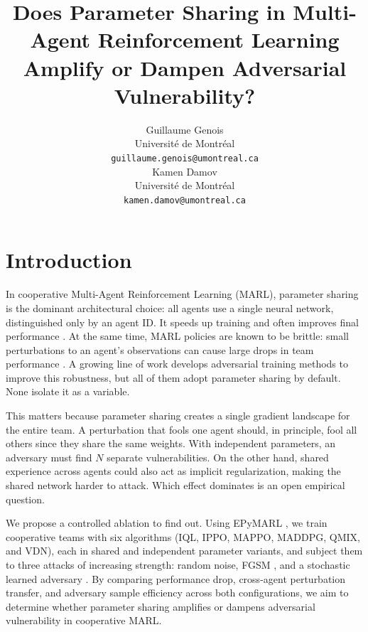 \documentclass{article}
\title{Does Parameter Sharing in Multi-Agent Reinforcement Learning\\Amplify or Dampen Adversarial Vulnerability?}
\author{%
  Guillaume Genois \\
  Université de Montréal \\
  \texttt{guillaume.genois@umontreal.ca} \\
  \And
  Kamen Damov \\
  Université de Montréal \\
  \texttt{kamen.damov@umontreal.ca} \\
}
\begin{document}
\maketitle

\begin{abstract}
\end{abstract}

\section{Introduction}
In cooperative Multi-Agent Reinforcement Learning (MARL), parameter sharing is the dominant architectural choice: all agents use a single neural network, distinguished only by an agent ID. It speeds up training and often improves final performance \citep{gupta2017cooperative}. At the same time, MARL policies are known to be brittle: small perturbations to an agent's observations can cause large drops in team performance \citep{zhang2021robust, zhou2025robust}. A growing line of work develops adversarial training methods to improve this robustness, but all of them adopt parameter sharing by default. None isolate it as a variable.

This matters because parameter sharing creates a single gradient landscape for the entire team. A perturbation that fools one agent should, in principle, fool all others since they share the same weights. With independent parameters, an adversary must find $N$ separate vulnerabilities. On the other hand, shared experience across agents could also act as implicit regularization, making the shared network harder to attack. Which effect dominates is an open empirical question.

We propose a controlled ablation to find out. Using EPyMARL \citep{christianos2020epymarl}, we train cooperative teams with six algorithms (IQL, IPPO, MAPPO, MADDPG, QMIX, and VDN), each in shared and independent parameter variants, and subject them to three attacks of increasing strength: random noise, FGSM \citep{goodfellow2014explaining}, and a stochastic learned adversary \citep{zhou2025robust}. By comparing performance drop, cross-agent perturbation transfer, and adversary sample efficiency across both configurations, we aim to determine whether parameter sharing amplifies or dampens adversarial vulnerability in cooperative MARL.
\end{document}
